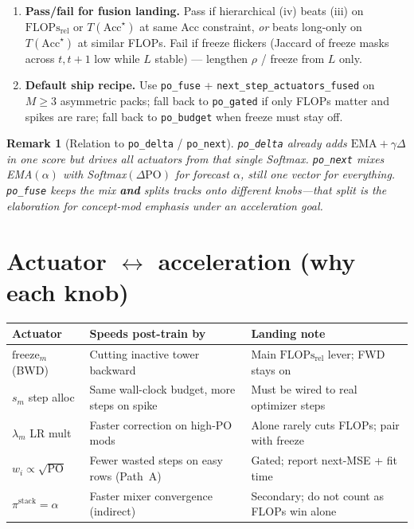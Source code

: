 \documentclass[11pt]{article}
\newtheorem{remark}{Remark}
\newcommand{\PO}{\mathrm{PO}}
\newcommand{\Acc}{\mathrm{Acc}}
\newcommand{\Flops}{\mathrm{FLOPs}_{\mathrm{rel}}}
\begin{document}
\begin{enumerate}[leftmargin=1.4em,itemsep=3pt]
  \item \textbf{Pass/fail for fusion landing.}
        Pass if hierarchical (iv) beats (iii) on
        $\Flops$ or $T(\Acc^\star)$ at same Acc constraint,
        \emph{or} beats long-only on $T(\Acc^\star)$ at similar FLOPs.
        Fail if freeze flickers (Jaccard of freeze masks across $t,t{+}1$
        low while $L$ stable) --- lengthen $\rho$ / freeze from $L$ only.

  \item \textbf{Default ship recipe.}
        Use \texttt{po\_fuse} + \texttt{next\_step\_actuators\_fused}
        on $M\ge3$ asymmetric packs; fall back to \texttt{po\_gated}
        if only FLOPs matter and spikes are rare; fall back to
        \texttt{po\_budget} when freeze must stay off.
\end{enumerate}

\begin{remark}[Relation to \texttt{po\_delta} / \texttt{po\_next}]
\texttt{po\_delta} already adds $\mathrm{EMA}+\gamma\Delta$ in one score
but drives \emph{all} actuators from that single Softmax.
\texttt{po\_next} mixes EMA$(\alpha)$ with Softmax$(\Delta\PO)$ for
forecast $\alpha$, still one vector for everything.
\texttt{po\_fuse} keeps the mix \textbf{and} splits tracks onto
different knobs---that split is the elaboration for concept-mod
emphasis under an acceleration goal.
\end{remark}

\section{Actuator $\leftrightarrow$ acceleration (why each knob)}
\label{sec:knobs}

\begin{center}
\small
\begin{tabular}{@{}llp{5.8cm}@{}}
\toprule
Actuator & Speeds post-train by & Landing note \\
\midrule
$\mathrm{freeze}_m$ (BWD)
  & Cutting inactive tower backward
  & Main $\Flops$ lever; FWD stays on \\
$s_m$ step alloc
  & Same wall-clock budget, more steps on spike
  & Must be wired to real optimizer steps \\
$\lambda_m$ LR mult
  & Faster correction on high-$\PO$ mods
  & Alone rarely cuts FLOPs; pair with freeze \\
$w_i\propto\sqrt{\PO}$
  & Fewer wasted steps on easy rows (Path~A)
  & Gated; report next-MSE + fit time \\
$\pi^{\mathrm{stack}}=\alpha$
  & Faster mixer convergence (indirect)
  & Secondary; do not count as FLOPs win alone \\
\bottomrule
\end{tabular}
\end{center}
\end{document}
